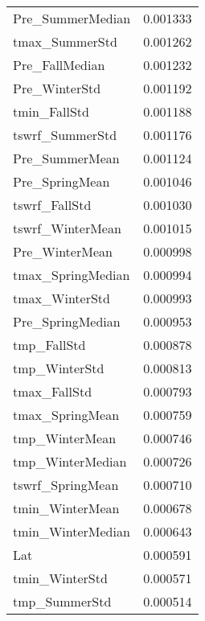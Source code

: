 \begin{tabular}{lr}
Pre_SummerMedian & 0.001333 \\
tmax_SummerStd & 0.001262 \\
Pre_FallMedian & 0.001232 \\
Pre_WinterStd & 0.001192 \\
tmin_FallStd & 0.001188 \\
tswrf_SummerStd & 0.001176 \\
Pre_SummerMean & 0.001124 \\
Pre_SpringMean & 0.001046 \\
tswrf_FallStd & 0.001030 \\
tswrf_WinterMean & 0.001015 \\
Pre_WinterMean & 0.000998 \\
tmax_SpringMedian & 0.000994 \\
tmax_WinterStd & 0.000993 \\
Pre_SpringMedian & 0.000953 \\
tmp_FallStd & 0.000878 \\
tmp_WinterStd & 0.000813 \\
tmax_FallStd & 0.000793 \\
tmax_SpringMean & 0.000759 \\
tmp_WinterMean & 0.000746 \\
tmp_WinterMedian & 0.000726 \\
tswrf_SpringMean & 0.000710 \\
tmin_WinterMean & 0.000678 \\
tmin_WinterMedian & 0.000643 \\
Lat & 0.000591 \\
tmin_WinterStd & 0.000571 \\
tmp_SummerStd & 0.000514 \\
\bottomrule
\end{tabular}
